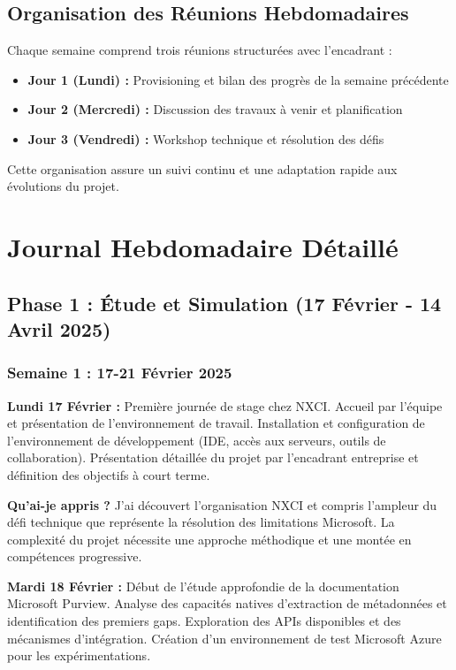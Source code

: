 \documentclass[a4paper,12pt]{article}
\begin{document}
\subsection{Organisation des Réunions Hebdomadaires}

Chaque semaine comprend trois réunions structurées avec l'encadrant :

\begin{itemize}
    \item \textbf{Jour 1 (Lundi) :} Provisioning et bilan des progrès de la semaine précédente
    \item \textbf{Jour 2 (Mercredi) :} Discussion des travaux à venir et planification
    \item \textbf{Jour 3 (Vendredi) :} Workshop technique et résolution des défis
\end{itemize}

Cette organisation assure un suivi continu et une adaptation rapide aux évolutions du projet.

\newpage

\section{Journal Hebdomadaire Détaillé}

\subsection{Phase 1 : Étude et Simulation (17 Février - 14 Avril 2025)}

\subsubsection{Semaine 1 : 17-21 Février 2025}

\textbf{Lundi 17 Février :}
Première journée de stage chez NXCI. Accueil par l'équipe et présentation de l'environnement de travail. Installation et configuration de l'environnement de développement (IDE, accès aux serveurs, outils de collaboration). Présentation détaillée du projet par l'encadrant entreprise et définition des objectifs à court terme.

\textbf{Qu'ai-je appris ?} J'ai découvert l'organisation NXCI et compris l'ampleur du défi technique que représente la résolution des limitations Microsoft. La complexité du projet nécessite une approche méthodique et une montée en compétences progressive.

\textbf{Mardi 18 Février :}
Début de l'étude approfondie de la documentation Microsoft Purview. Analyse des capacités natives d'extraction de métadonnées et identification des premiers gaps. Exploration des APIs disponibles et des mécanismes d'intégration. Création d'un environnement de test Microsoft Azure pour les expérimentations.
\end{document}

